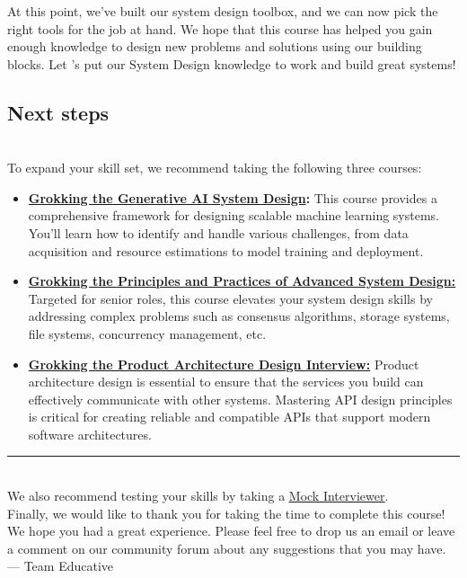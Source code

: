At this point, we've built our system design toolbox, and we can now pick the right tools for the job at hand. We hope that this course has helped you gain enough knowledge to design new problems and solutions using our building blocks. Let 's put our System Design knowledge to work and build great systems!

\subsection{Next steps}\label{IjQzJWZQCAcqDJficIkgd}
\\
To expand your skill set, we recommend taking the following three courses:

\begin{itemize}
\item
\protect{}\label{ea3SvbkrDNmdYCTqYLLAf}
\href{https://www.educative.io/courses/lta/generative-ai-system-design}{\textbf{Grokking the Generative AI System Design}}\textbf{:} This course provides a comprehensive framework for designing scalable machine learning systems. You'll learn how to identify and handle various challenges, from data acquisition and resource estimations to model training and deployment.
\item
\protect{}\label{RAl-5qx9kYZSXmYpsaEzU}
\href{https://www.educative.io/courses/grokking-the-principles-and-practices-of-advanced-system-design}{\textbf{Grokking the Principles and Practices of Advanced System Design:}} Targeted for senior roles, this course elevates your system design skills by addressing complex problems such as consensus algorithms, storage systems, file systems, concurrency management, etc.
\item
\protect{}\label{PufVH5vcs3I9CCLUL7u98}
\href{https://www.educative.io/courses/grokking-the-api-design-interview}{\textbf{Grokking the Product Architecture Design Interview:}} Product architecture design is essential to ensure that the services you build can effectively communicate with other systems. Mastering API design principles is critical for creating reliable and compatible APIs that support modern software architectures.
\end{itemize}

\begin{center}\rule{0.5\linewidth}{0.5pt}\end{center}
\\
We also recommend testing your skills by taking a \href{https://www.mockinterviews.dev/}{\ul{Mock Interviewer}}.
\\
Finally, we would like to thank you for taking the time to complete this course! We hope you had a great experience. Please feel free to drop us an email or leave a comment on our community forum about any suggestions that you may have.
\\
--- Team Educative

